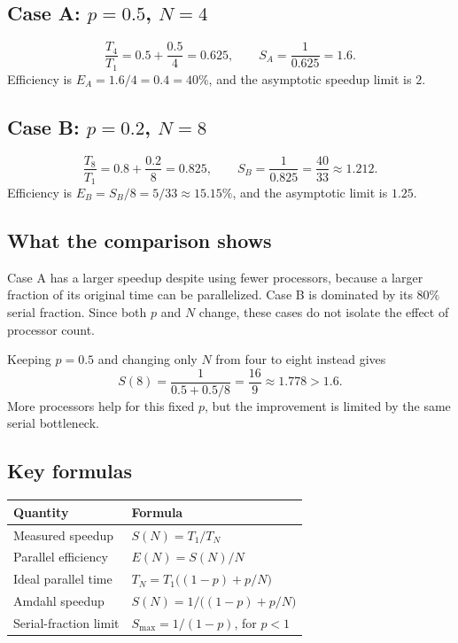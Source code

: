 \documentclass[11pt,a4paper]{article}
\begin{document}
\subsection{Case A: \texorpdfstring{$p=0.5$, $N=4$}{p=0.5, N=4}}
\[
  \frac{T_4}{T_1}=0.5+\frac{0.5}{4}=0.625,
  \qquad S_A=\frac{1}{0.625}=\boxed{1.6}.
\]
Efficiency is $E_A=1.6/4=0.4=40\%$, and the asymptotic speedup limit is $2$.

\subsection{Case B: \texorpdfstring{$p=0.2$, $N=8$}{p=0.2, N=8}}
\[
  \frac{T_8}{T_1}=0.8+\frac{0.2}{8}=0.825,
  \qquad S_B=\frac{1}{0.825}=\boxed{\frac{40}{33}\approx1.212}.
\]
Efficiency is $E_B=S_B/8=5/33\approx15.15\%$, and the asymptotic limit is $1.25$.

\subsection{What the comparison shows}
Case A has a larger speedup despite using fewer processors, because a larger
fraction of its original time can be parallelized. Case B is dominated by
its $80\%$ serial fraction. Since both $p$ and $N$ change, these cases do not
isolate the effect of processor count.

Keeping $p=0.5$ and changing only $N$ from four to eight instead gives
\[
  S(8)=\frac{1}{0.5+0.5/8}=\frac{16}{9}\approx1.778>1.6.
\]
More processors help for this fixed $p$, but the improvement is limited by
the same serial bottleneck.

\subsection{Key formulas}
\begin{center}
\begin{tabular}{@{}ll@{}}
\toprule
Quantity & Formula\\
\midrule
Measured speedup & $S(N)=T_1/T_N$\\[0.4em]
Parallel efficiency & $E(N)=S(N)/N$\\[0.4em]
Ideal parallel time & $T_N=T_1\bigl((1-p)+p/N\bigr)$\\[0.4em]
Amdahl speedup & $S(N)=1/\bigl((1-p)+p/N\bigr)$\\[0.4em]
Serial-fraction limit & $S_{\max}=1/(1-p)$, for $p<1$\\
\bottomrule
\end{tabular}
\end{center}
\end{document}
